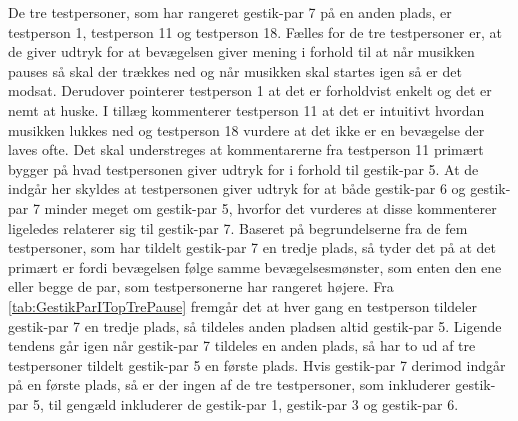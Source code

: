 De tre testpersoner, som har rangeret gestik-par 7 på en anden plads, er testperson 1, testperson 11 og testperson 18. Fælles for de tre testpersoner er, at de giver udtryk for at bevægelsen giver mening i forhold til at når musikken pauses så skal der trækkes ned og når musikken skal startes igen så er det modsat. Derudover pointerer testperson 1 at det er forholdvist enkelt og det er nemt at huske. I tillæg kommenterer testperson 11 at det er intuitivt hvordan musikken lukkes ned og testperson 18 vurdere at det ikke er en bevægelse der laves ofte. Det skal understreges at kommentarerne fra testperson 11 primært bygger på hvad testpersonen giver udtryk for i forhold til gestik-par 5. At de indgår her skyldes at testpersonen giver udtryk for at både gestik-par 6 og gestik-par 7 minder meget om gestik-par 5, hvorfor det vurderes at disse kommenterer ligeledes relaterer sig til gestik-par 7. Baseret på begrundelserne fra de fem testpersoner, som har tildelt gestik-par 7 en tredje plads, så tyder det på at det primært er fordi bevægelsen følge samme bevægelsesmønster, som enten den ene eller begge de par, som testpersonerne har rangeret højere. Fra \autoref{tab:GestikParITopTrePause} fremgår det at hver gang en testperson tildeler gestik-par 7 en tredje plads, så tildeles anden pladsen altid gestik-par 5. Ligende tendens går igen når gestik-par 7 tildeles en anden plads, så har to ud af tre testpersoner tildelt gestik-par 5 en første plads. Hvis gestik-par 7 derimod indgår på en første plads, så er der ingen af de tre testpersoner, som inkluderer gestik-par 5, til gengæld inkluderer de gestik-par 1, gestik-par 3 og gestik-par 6. 

